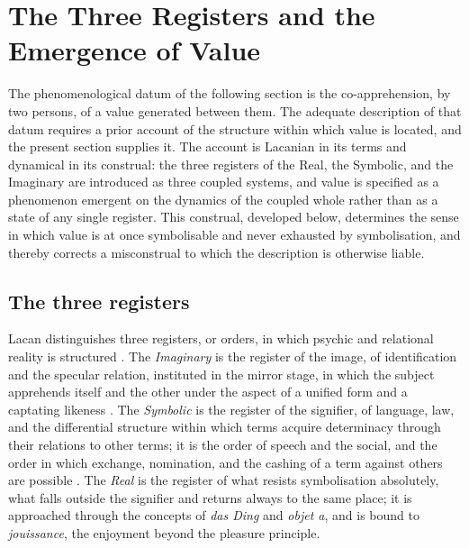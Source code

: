\section{The Three Registers and the Emergence of Value}
\label{p10:sec:registers}

\noindent
The phenomenological datum of the following section is the co-apprehension, by two persons, of a value generated between them. The adequate description of that datum requires a prior account of the structure within which value is located, and the present section supplies it. The account is Lacanian in its terms and dynamical in its construal: the three registers of the Real, the Symbolic, and the Imaginary are introduced as three coupled systems, and value is specified as a phenomenon emergent on the dynamics of the coupled whole rather than as a state of any single register. This construal, developed below, determines the sense in which value is at once symbolisable and never exhausted by symbolisation, and thereby corrects a misconstrual to which the description is otherwise liable.

\subsection{The three registers}
\label{p10:sec:rsi}

Lacan distinguishes three registers, or orders, in which psychic and relational reality is structured \parencite{evans1996}. The \emph{Imaginary} is the register of the image, of identification and the specular relation, instituted in the mirror stage, in which the subject apprehends itself and the other under the aspect of a unified form and a captating likeness \parencite{lacan2006}. The \emph{Symbolic} is the register of the signifier, of language, law, and the differential structure within which terms acquire determinacy through their relations to other terms; it is the order of speech and the social, and the order in which exchange, nomination, and the cashing of a term against others are possible \parencite{lacan2006}. The \emph{Real} is the register of what resists symbolisation absolutely, what falls outside the signifier and returns always to the same place; it is approached through the concepts of \emph{das Ding} and \emph{objet a}, and is bound to \emph{jouissance}, the enjoyment beyond the pleasure principle.

